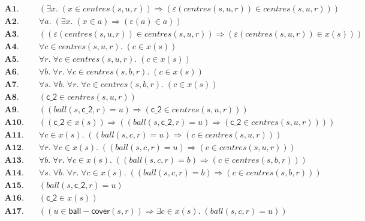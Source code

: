 \documentclass[11pt]{article}
\begin{document}
\begin{align*}
  \mathbf{A1.}\quad & (\exists x.\; (x \in \mathit{centres}(s, u, r)) \Rightarrow (\varepsilon(\mathit{centres}(s, u, r)) \in \mathit{centres}(s, u, r))) \\
  \mathbf{A2.}\quad & \forall a.\; (\exists x.\; (x \in a) \Rightarrow (\varepsilon(a) \in a)) \\
  \mathbf{A3.}\quad & ((\varepsilon(\mathit{centres}(s, u, r)) \in \mathit{centres}(s, u, r)) \Rightarrow (\varepsilon(\mathit{centres}(s, u, r)) \in x(s))) \\
  \mathbf{A4.}\quad & \forall c \in \mathit{centres}(s, u, r).\; (c \in x(s)) \\
  \mathbf{A5.}\quad & \forall r.\; \forall c \in \mathit{centres}(s, u, r).\; (c \in x(s)) \\
  \mathbf{A6.}\quad & \forall b.\; \forall r.\; \forall c \in \mathit{centres}(s, b, r).\; (c \in x(s)) \\
  \mathbf{A7.}\quad & \forall s.\; \forall b.\; \forall r.\; \forall c \in \mathit{centres}(s, b, r).\; (c \in x(s)) \\
  \mathbf{A8.}\quad & (\mathsf{c\_2} \in \mathit{centres}(s, u, r)) \\
  \mathbf{A9.}\quad & ((\mathit{ball}(s, \mathsf{c\_2}, r) = u) \Rightarrow (\mathsf{c\_2} \in \mathit{centres}(s, u, r))) \\
  \mathbf{A10.}\quad & ((\mathsf{c\_2} \in x(s)) \Rightarrow ((\mathit{ball}(s, \mathsf{c\_2}, r) = u) \Rightarrow (\mathsf{c\_2} \in \mathit{centres}(s, u, r)))) \\
  \mathbf{A11.}\quad & \forall c \in x(s).\; ((\mathit{ball}(s, c, r) = u) \Rightarrow (c \in \mathit{centres}(s, u, r))) \\
  \mathbf{A12.}\quad & \forall r.\; \forall c \in x(s).\; ((\mathit{ball}(s, c, r) = u) \Rightarrow (c \in \mathit{centres}(s, u, r))) \\
  \mathbf{A13.}\quad & \forall b.\; \forall r.\; \forall c \in x(s).\; ((\mathit{ball}(s, c, r) = b) \Rightarrow (c \in \mathit{centres}(s, b, r))) \\
  \mathbf{A14.}\quad & \forall s.\; \forall b.\; \forall r.\; \forall c \in x(s).\; ((\mathit{ball}(s, c, r) = b) \Rightarrow (c \in \mathit{centres}(s, b, r))) \\
  \mathbf{A15.}\quad & (\mathit{ball}(s, \mathsf{c\_2}, r) = u) \\
  \mathbf{A16.}\quad & (\mathsf{c\_2} \in x(s)) \\
  \mathbf{A17.}\quad & ((u \in \mathsf{ball{-}cover}(s, r)) \Rightarrow \exists c \in x(s).\; (\mathit{ball}(s, c, r) = u)) \\

\end{align*}
\end{document}
